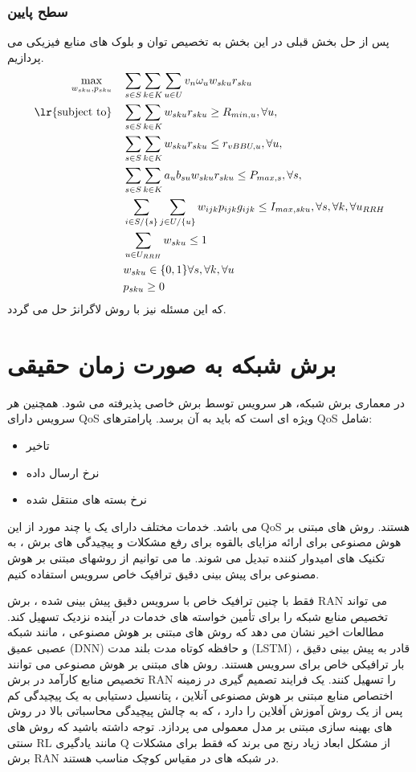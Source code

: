 \subsubsection{سطح پایین}
 پس از حل بخش قبلی در این بخش به تخصیص توان و بلوک های منابع فیزیکی می پردازیم.
 \begin{equation}
\begin{aligned}
\max\limits_{w_{sku},p_{sku}}   \quad &  \sum_{s\in S} \sum_{k\in K} \sum_{u\in U}
v_n \omega_u  w_{sku} r_{sku} \\
\text{\lr{subject to}} \quad  & \sum_{s\in S} \sum_{k\in K}  w_{sku} r_{sku} \geq R_{min,u} , \forall u,   \\
& \sum_{s\in S} \sum_{k\in K}   w_{sku} r_{sku} \leq  r_{vBBU,u}  , \forall u,   \\
& \sum_{s\in S} \sum_{k\in K} a_u b_{su} w_{sku} r_{sku} \leq P_{max,s}  , \forall s,   \\
&\sum_{i\in S/\{s\}}\sum_{j\in U/\{u\}}w_{ijk}p_{ijk}g_{ijk} \leq I_{max,sku}  , \forall s, \forall k, \forall u_{RRH}   \\
& \sum_{u \in U_{RRH}}  w_{sku} \leq 1 \\ 
&   w_{sku} \in \{0,1\}  \forall s, \forall k, \forall u   \\ 
& p_{sku} \geq 0 \\
\end{aligned}	
\end{equation}
که این مسئله نیز با روش لاگرانژ حل می گردد.
\section{برش شبکه به صورت زمان حقیقی }
در معماری برش شبکه، هر سرویس توسط برش خاصی پذیرفته می شود. همچنین هر سرویس دارای QoS ویژه ای است که باید به آن برسد. پارامترهای QoS شامل:
\begin{itemize}
\item تاخیر
\item نرخ ارسال داده
\item نرخ بسته های منتقل شده
\end{itemize}  
می باشد.
خدمات مختلف دارای یک یا چند مورد از این QoS هستند. روش های مبتنی بر هوش مصنوعی برای ارائه مزایای بالقوه برای رفع مشکلات و پیچیدگی های برش ، به تکنیک های امیدوار کننده تبدیل می شوند. ما می توانیم از روشهای مبتنی بر هوش مصنوعی برای پیش بینی دقیق ترافیک خاص سرویس استفاده کنیم.


فقط با چنین ترافیک خاص با سرویس دقیق پیش بینی شده ، برش RAN می تواند تخصیص منابع شبکه را برای تأمین خواسته های خدمات در آینده نزدیک تسهیل کند.
مطالعات اخیر نشان می دهد که روش های مبتنی بر هوش مصنوعی ، مانند شبکه عصبی عمیق (DNN) و حافظه کوتاه مدت بلند مدت (LSTM) ، قادر به پیش بینی دقیق بار ترافیکی خاص برای سرویس هستند.
روش های مبتنی بر هوش مصنوعی می توانند تخصیص منابع کارآمد در برش RAN را تسهیل کنند. یک فرایند تصمیم گیری در زمینه اختصاص منابع مبتنی بر هوش مصنوعی آنلاین ، پتانسیل دستیابی به یک پیچیدگی کم پس از یک روش آموزش آفلاین را دارد ، که به چالش پیچیدگی محاسباتی بالا در روش های بهینه سازی مبتنی بر مدل معمولی می پردازد.
  توجه داشته باشید که روش های سنتی RL مانند یادگیری Q از مشکل ابعاد زیاد رنج می برند که فقط برای مشکلات برش RAN در شبکه های در مقیاس کوچک مناسب هستند.

